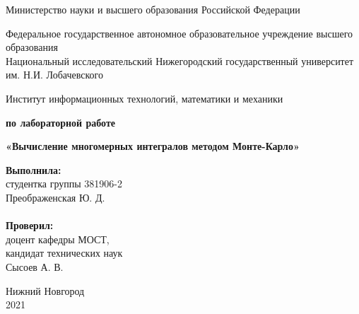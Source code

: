 \documentclass{report}
\begin{document}
\begin{titlepage}

\begin{center}
Министерство науки и высшего образования Российской Федерации
\end{center}

\begin{center}
Федеральное государственное автономное образовательное учреждение высшего образования \\
Национальный исследовательский Нижегородский государственный университет им. Н.И. Лобачевского
\end{center}

\begin{center}
Институт информационных технологий, математики и механики
\end{center}

\vspace{4em}

\begin{center}
\textbf{ по лабораторной работе} \\
\end{center}
\begin{center}
\textbf{\Large«Вычисление многомерных интегралов методом Монте-Карло»} \\
\end{center}

\vspace{4em}

\newbox{\lbox}
\newlength{\maxl}
\setlength{\maxl}{\wd\lbox}
\hfill\parbox{7cm}{
\hspace*{5cm}\hspace*{-5cm}\textbf{Выполнила:} \\ студентка группы 381906-2 \\ Преображенская Ю. Д.\\
\\
\hspace*{5cm}\hspace*{-5cm}\textbf{Проверил:}\\ доцент кафедры МОСТ, \\ кандидат технических наук \\ Сысоев А. В.\\
}
\vspace{\fill}

\begin{center} Нижний Новгород \\ 2021 \end{center}

\end{titlepage}
\end{document}
